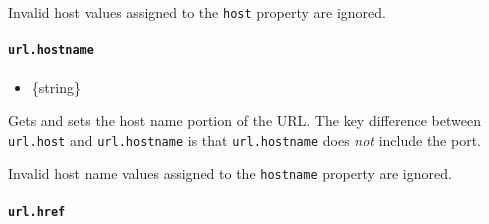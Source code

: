 Invalid host values assigned to the \texttt{host} property are ignored.

\paragraph{\texorpdfstring{\texttt{url.hostname}}{url.hostname}}\label{url.hostname}

\begin{itemize}
\tightlist
\item
  \{string\}
\end{itemize}

Gets and sets the host name portion of the URL. The key difference
between \texttt{url.host} and \texttt{url.hostname} is that
\texttt{url.hostname} does \emph{not} include the port.

\begin{Shaded}
\begin{Highlighting}[]
\OperatorTok{=}  \NormalTok{(}\NormalTok{)}\OperatorTok{;}
\NormalTok{)}\OperatorTok{;}

 \OperatorTok{=} \OperatorTok{;}
\NormalTok{)}\OperatorTok{;}

 \OperatorTok{=} \OperatorTok{;}
\NormalTok{)}\OperatorTok{;}
\end{Highlighting}
\end{Shaded}

Invalid host name values assigned to the \texttt{hostname} property are
ignored.

\paragraph{\texorpdfstring{\texttt{url.href}}{url.href}}\label{url.href}

